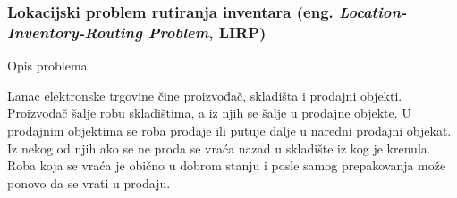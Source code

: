\documentclass[a4paper]{article}
\begin{document}
\subsubsection{Lokacijski problem rutiranja inventara (eng. \textit{Location-Inventory-Routing Problem}, LIRP) \cite{gannealingaplication}}

\large{Opis problema}  \normalsize

Lanac elektronske trgovine čine proizvođač, skladišta i prodajni objekti. Proizvođač šalje robu skladištima, a iz njih se šalje u prodajne objekte. U prodajnim objektima se roba prodaje ili putuje dalje u naredni prodajni objekat. Iz nekog od njih ako se ne proda se vraća nazad u skladište iz kog je krenula. Roba koja se vraća je obično u dobrom stanju i posle samog prepakovanja može ponovo da se vrati u prodaju. 
\end{document}

